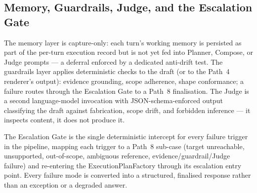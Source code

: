 \subsection{Memory, Guardrails, Judge, and the Escalation Gate}
The memory layer is capture-only: each turn's working memory is persisted as part of the per-turn execution record but is not yet fed into Planner, Compose, or Judge prompts --- a deferral enforced by a dedicated anti-drift test. The guardrails layer applies deterministic checks to the draft (or to the Path~4 renderer's output): evidence grounding, scope adherence, shape conformance; a failure routes through the Escalation Gate to a Path~8 finalisation. The Judge is a second language-model invocation with JSON-schema-enforced output classifying the draft against fabrication, scope drift, and forbidden inference --- it inspects content, it does not produce it.

The Escalation Gate is the single deterministic intercept for every failure trigger in the pipeline, mapping each trigger to a Path~8 sub-case (target unreachable, unsupported, out-of-scope, ambiguous reference, evidence/guardrail/Judge failure) and re-entering the ExecutionPlanFactory through its escalation entry point. Every failure mode is converted into a structured, finalised response rather than an exception or a degraded answer.

